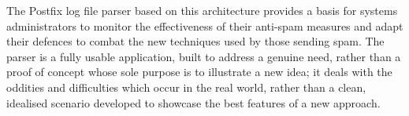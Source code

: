 \documentclass[draft]{svmult}
\begin{document}
The Postfix log file parser based on this architecture provides a basis for
systems administrators to monitor the effectiveness of their anti-spam
measures and adapt their defences to combat the new techniques used by
those sending spam.  The parser is a fully usable application, built to
address a genuine need, rather than a proof of concept whose sole purpose
is to illustrate a new idea; it deals with the oddities and difficulties
which occur in the real world, rather than a clean, idealised scenario
developed to showcase the best features of a new approach.



\label{bibliography}

\renewcommand{\glossarytitle}{\section{Glossary}\label{Glossary}}
\printglossary{}

\end{document}

